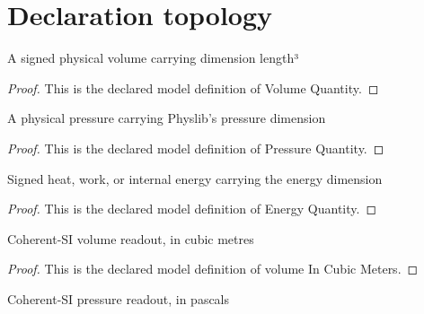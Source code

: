 \section{Declaration topology}
\begin{definition}
  \label{def:physics:phyx-mini-0482:phyxminiproblems-problemphyxmini0482-volumequantity}
  A signed physical volume carrying dimension length³
\end{definition}
\begin{proof}
  This is the declared model definition of Volume Quantity.
\end{proof}
\begin{definition}
  \label{def:physics:phyx-mini-0482:phyxminiproblems-problemphyxmini0482-pressurequantity}
  A physical pressure carrying Physlib's pressure dimension
\end{definition}
\begin{proof}
  This is the declared model definition of Pressure Quantity.
\end{proof}
\begin{definition}
  \label{def:physics:phyx-mini-0482:phyxminiproblems-problemphyxmini0482-energyquantity}
  Signed heat, work, or internal energy carrying the energy dimension
\end{definition}
\begin{proof}
  This is the declared model definition of Energy Quantity.
\end{proof}
\begin{definition}
  \label{def:physics:phyx-mini-0482:phyxminiproblems-problemphyxmini0482-volumeincubicmeters}
  Coherent-SI volume readout, in cubic metres
\end{definition}
\begin{proof}
  This is the declared model definition of volume In Cubic Meters.
\end{proof}
\begin{definition}
  \label{def:physics:phyx-mini-0482:phyxminiproblems-problemphyxmini0482-pressureinpascals}
  Coherent-SI pressure readout, in pascals
\end{definition}

